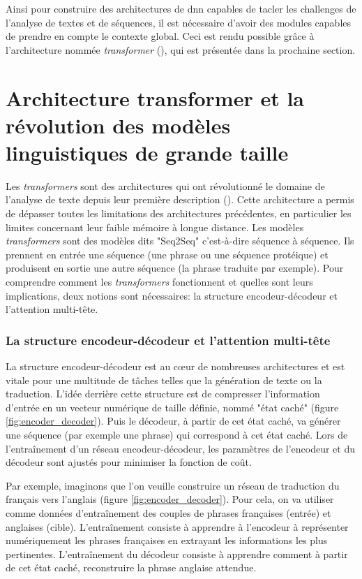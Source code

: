 Ainsi pour construire des architectures de \gls{dnn} capables de tacler les challenges de l'analyse de textes et de séquences, il est nécessaire d'avoir des modules capables de prendre en compte le contexte global. Ceci est rendu possible grâce à l'architecture nommée \textit{transformer} (\cite{vaswani_attention_2017}), qui est présentée dans la prochaine section.


\section{Architecture transformer et la révolution des modèles linguistiques de grande taille}
Les \textit{transformers} sont des architectures qui ont révolutionné le domaine de l'analyse de texte depuis leur première description (\cite{vaswani_attention_2017}). Cette architecture a permis de dépasser toutes les limitations des architectures précédentes, en particulier les limites concernant leur faible mémoire à longue distance. Les modèles \textit{transformers} sont des modèles dits "Seq2Seq" c'est-à-dire séquence à séquence. Ils prennent en entrée une séquence (une phrase ou une séquence protéique) et produisent en sortie une autre séquence (la phrase traduite par exemple). Pour comprendre comment les \textit{transformers} fonctionnent et quelles sont leurs implications, deux notions sont nécessaires: la structure encodeur-décodeur et l'attention multi-tête.

\subsubsection{La structure encodeur-décodeur et l'attention multi-tête}
La structure encodeur-décodeur est au cœur de nombreuses architectures et est vitale pour une multitude de tâches telles que la génération de texte ou la traduction. L'idée derrière cette structure est de compresser l'information d'entrée en un vecteur numérique de taille définie, nommé "état caché" (figure \ref{fig:encoder_decoder}). Puis le décodeur, à partir de cet état caché, va générer une séquence (par exemple une phrase) qui correspond à cet état caché. Lors de l'entraînement d'un réseau encodeur-décodeur, les paramètres de l'encodeur et du décodeur sont ajustés pour minimiser la fonction de coût. 


Par exemple, imaginons que l'on veuille construire un réseau de traduction du français vers l’anglais (figure \ref{fig:encoder_decoder}). Pour cela, on va utiliser comme données d'entraînement des couples de phrases françaises (entrée) et anglaises (cible). L'entraînement consiste à apprendre à l'encodeur à représenter numériquement les phrases françaises en extrayant les informations les plus pertinentes. L'entraînement du décodeur consiste à apprendre comment à partir de cet état caché, reconstruire la phrase anglaise attendue.


